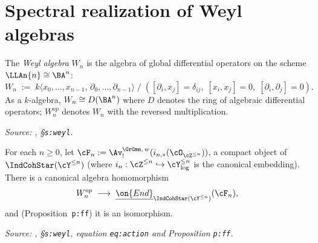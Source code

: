 \section{Spectral realization of Weyl algebras}
\label{sec:dmod}

\begin{definition}
  \label{def:weyl-algebra-Wn}
  The \emph{Weyl algebra} $W_n$ is the algebra of global differential operators
  on the scheme $\LLAn{n} \cong \BA^n$:
  \[
    W_n \;:=\; k\langle x_0,\ldots,x_{n-1},\, \partial_0,\ldots,\partial_{n-1}
    \rangle \;\big/\; ([\partial_i, x_j] = \delta_{ij},\; [x_i,x_j] = 0,\;
    [\partial_i,\partial_j] = 0).
  \]
  As a $k$-algebra, $W_n \cong D(\BA^n)$ where $D$ denotes the ring of
  algebraic differential operators; $W_n^{op}$ denotes $W_n$ with the
  reversed multiplication.

  \textit{Source: \cite{hilburn-raskin}, \S\texttt{s:weyl}.}
\end{definition}

\begin{theorem}
  \label{thm:spectral-realization}
  For each $n \geq 0$, let
  $\cF_n := \Av_!^{\GrGmn,\, w}(i_{n,*}(\cO_{\cZ^{\leq n}}))$, a compact object
  of $\IndCohStar(\cY^{\leq n})$ (where $i_n : \cZ^{\leq n}\hookrightarrow
  \cY_{\log}^{\leq n}$ is the canonical embedding). There is a canonical
  algebra homomorphism
  \[
    W_n^{op} \;\longrightarrow\;
    \underline{\on{End}}_{\IndCohStar(\cY^{\leq n})}(\cF_n),
  \]
  and (Proposition~\texttt{p:ff}) it is an isomorphism.

  \textit{Source: \cite{hilburn-raskin}, \S\texttt{s:weyl}, equation \texttt{eq:action} and Proposition \texttt{p:ff}.}
\end{theorem}

